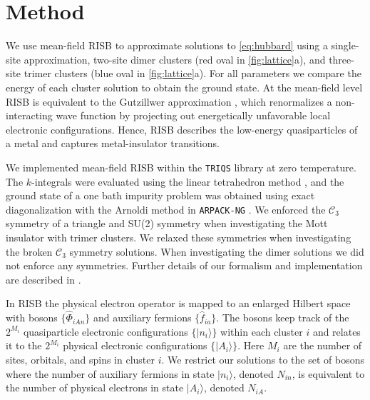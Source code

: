 \documentclass[reprint,aps,prb,amsmath,amssymb]{revtex4-2}
\begin{document}
\section{Method}

We use mean-field RISB \cite{Kotliar1986,Lechermann2007,Lanata2015,Lanata2017} to approximate solutions to \cref{eq:hubbard} using a single-site approximation, two-site dimer clusters (red oval in \cref{fig:lattice}a), and three-site trimer clusters (blue oval in \cref{fig:lattice}a). For all parameters we compare the energy of each cluster solution to obtain the ground state. At the mean-field level RISB is equivalent to the Gutzillwer approximation \cite{Bunemann2007}, which renormalizes a non-interacting wave function by projecting out energetically unfavorable local electronic configurations. Hence, RISB describes the low-energy quasiparticles of a metal and captures metal-insulator transitions.

We implemented mean-field RISB within the \verb+TRIQS+ library \cite{Parcollet2015,Seth2016} at zero temperature. The $k$-integrals were evaluated using the linear tetrahedron method \cite{Blochl1994}, and the ground state of a one bath impurity problem was obtained using exact diagonalization with the Arnoldi method in \verb+ARPACK-NG+ \cite{TRIQS-ARPACK}. We enforced the $\mathcal{C}_3$ symmetry of a triangle and SU(2) symmetry when investigating the Mott insulator with trimer clusters. We relaxed these symmetries when investigating the broken $\mathcal{C}_3$ symmetry solutions. When investigating the dimer solutions we did not enforce any symmetries. Further details of our formalism and implementation are described in \cite{Nourse2021a,Nourse2021b}.

In RISB the physical electron operator is mapped to an enlarged Hilbert space with bosons $\{ \hat{\Phi}_{iAn} \}$ and auxiliary fermions $\{ \hat{f}_{ia} \}$. The bosons keep track of the $2^{M_i}$ quasiparticle electronic configurations $\{ |n_i \rangle \}$ within each cluster $i$ and relates it to the $2^{M_i}$ physical electronic configurations $\{ | A_i \rangle \}$. Here $M_i$ are the number of sites, orbitals, and spins in cluster $i$. We restrict our solutions to the set of bosons where the number of auxiliary fermions in state $| n_i \rangle$, denoted $N_{in}$, is equivalent to the number of physical electrons in state $| A_i \rangle$, denoted $N_{iA}$.
\end{document}
